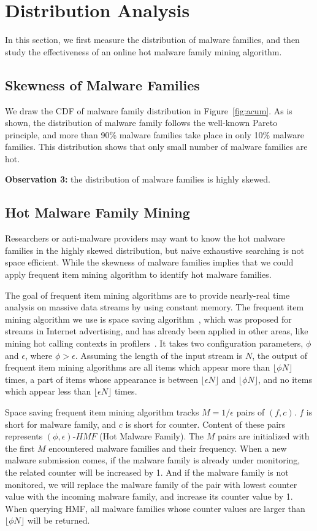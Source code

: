 \section{Distribution Analysis}
\label{sec:dist}
In this section, we first measure the distribution of malware families, and then study the effectiveness of an online hot malware family mining algorithm.

\subsection{Skewness of Malware Families}
We draw the CDF of malware family distribution in Figure~\ref{fig:acum}. As is shown, the distribution of malware family follows the well-known Pareto principle, 
and more than 90\% malware families take place in only 10\% malware families. This distribution shows that only small number of malware families are hot. 

{\bf Observation 3:} the distribution of malware families is highly skewed. 
\subsection{Hot Malware Family Mining}


Researchers or anti-malware providers may want to know the hot malware families in the highly skewed distribution, but naive exhaustive searching is not space efficient. While the skewness of malware families implies that we could apply frequent item mining algorithm to identify hot malware families. 

The goal of frequent item mining algorithms are to provide nearly-real time analysis on massive data streams by using constant memory. 
The frequent item mining algorithm we use is space saving algorithm~\cite{space-saving}, 
which was proposed for streams in Internet advertising, and has already been applied in other areas, 
like mining hot calling contexts in profilers~\cite{hot-calling-context}.
It takes two configuration parameters, $\phi$ and $\epsilon$, where $\phi > \epsilon$. 
Assuming the length of the input stream is $N$, the output of frequent item mining algorithms 
are all items which appear more than $\lfloor \phi N \rfloor$ times, a part of items whose appearance is between $\lfloor \epsilon N \rfloor$ and $\lfloor \phi N \rfloor$,
and no items which appear less than  $\lfloor \epsilon N \rfloor$ times. 



Space saving frequent item mining algorithm tracks $M=1/\epsilon$ pairs of $(f, c)$. 
$f$ is short for malware family, and $c$ is short for counter.  
Content of these pairs represents $(\phi, \epsilon)\mbox{-}HMF$ (Hot Malware Family). 
The $M$ pairs are initialized with the first $M$ encountered malware families and their frequency. 
When a new malware submission comes, 
if the malware family is already under monitoring, 
the related counter will be increased by 1. 
And if the malware family is not monitored, 
we will replace the malware family of the pair with lowest counter value with the incoming malware family, 
and increase its counter value by 1. 
When querying HMF, 
all malware families whose counter values are larger than $\lfloor \phi N \rfloor$ will be returned. 

